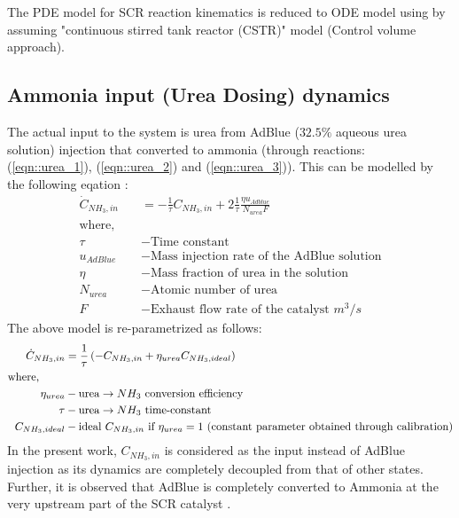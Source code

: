 The PDE model for SCR reaction kinematics \cite{nova2014urea} is reduced to ODE model \cite{devarakonda2008adequacy} using by assuming "continuous stirred tank reactor (CSTR)" model (Control volume approach).

\subsection{Ammonia input (Urea Dosing) dynamics}
The actual input to the system is urea from AdBlue ($32.5\%$ aqueous urea
solution) injection that converted to ammonia (through reactions:
(\ref{eqn::urea_1}), (\ref{eqn::urea_2}) and (\ref{eqn::urea_3})). This can be modelled by the following eqation \cite{nova2014urea}:
\begin{align*}
    \dot C_{NH_3, in} &= - \frac{1}{\tau} C_{NH_3, in} + 2 \frac{1}{\tau} \frac{ \eta u_{Adblue}}{N_{urea} F}\\
    \text{where, } \quad &\\
    \tau &- \text{Time constant}\\
    u_{AdBlue} &- \text{Mass injection rate of the AdBlue solution}\\
    \eta &- \text{Mass fraction of urea in the solution}\\
    N_{urea} &- \text{Atomic number of urea}\\
    F &- \text{Exhaust flow rate of the catalyst } m^3/s
\end{align*}
The above model is re-parametrized as follows:
\begin{align*}
    \dot C_{NH_3, in} &= \frac{1}{\tau} \left(  -C_{NH_3, in} +\eta_{urea} C_{NH_3, ideal} \right) \\
    \text{where, }\qquad &\\
    \eta_{urea} &- \text{urea} \rightarrow NH_3 \text{ conversion efficiency}\\
    \tau &- \text{urea} \rightarrow NH_3 \text{ time-constant}\\
    C_{NH_3, ideal} &- \text{ideal $C_{NH_3, in}$ if $\eta_{urea} = 1$ (constant parameter obtained through calibration)}
\end{align*}
In the present work, $C_{NH_3, in}$ is considered as the input instead of AdBlue
injection as its dynamics are completely decoupled from that of other states.
Further, it is observed that AdBlue is completely converted to Ammonia at the
very upstream part of the SCR catalyst \cite{hsieh2011development}.



